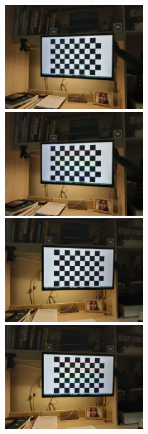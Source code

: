 \documentclass[]{article}
\begin{document}
    \begin{figure}[htbp]
        \centering
        \begin{minipage}[t]{0.4\textwidth}
            \centering
            \includegraphics[width=6cm]{../code/images/0.jpg}
        \end{minipage}
        \begin{minipage}[t]{0.4\textwidth}
            \centering
            \includegraphics[width=6cm]{../code/images/0_jpg_with_corners.jpg}
        \end{minipage}

        \begin{minipage}[t]{0.4\textwidth}
            \centering
            \includegraphics[width=6cm]{../code/images/1.jpg}
        \end{minipage}
        \begin{minipage}[t]{0.4\textwidth}
            \centering
            \includegraphics[width=6cm]{../code/images/1_jpg_with_corners.jpg}
        \end{minipage}


\end{figure}
\end{document}
